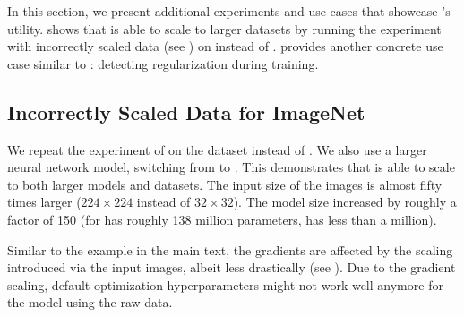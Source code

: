In this section, we present additional experiments and use cases that showcase
\cockpit's utility.  shows that
\cockpit is able to scale to larger datasets by running the experiment with
incorrectly scaled data (see ) on
\imagenet instead of \cifarten. 
provides another concrete use case similar to :
detecting regularization during training.

\subsection{Incorrectly Scaled Data for
  ImageNet}\label{cockpit::app:misscaled_data_exp_imagenet}

We repeat the experiment of  on the \imagenet
\citep{deng2009imagenet} dataset instead of \cifarten. We also use a larger neural
network model, switching from \threecthreed to \vgg \citep{simonyan2015deep}. This
demonstrates that \cockpit is able to scale to both larger models and datasets.
The input size of the images is almost fifty times larger ($224 \times 224$
instead of $32 \times 32$). The model size increased by roughly a factor of 150
(\vgg for \imagenet has roughly 138 million parameters, \threecthreed has less
than a million).

Similar to the example in the main text, the gradients are affected by the
scaling introduced via the input images, albeit less drastically (see
). Due to the gradient scaling,
default optimization hyperparameters might not work well anymore for the model
using the raw data.



